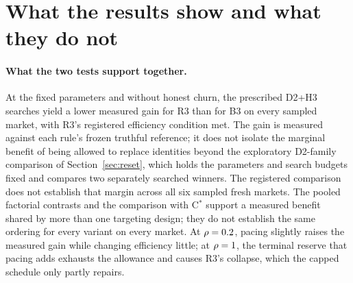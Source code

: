 \documentclass[11pt]{article}
\begin{document}
\begin{table}\centering\small
{}
\caption{Exploratory follow-up: per churn rate and rule, under the rule's selected attack, the share of the attacker's jobs audited, the share of jobs served by honest identities younger than ten rounds and the share of all audits they receive, the audited share of established honest jobs, the number of markets whose selected attack never replaces its identity, and gross efficiency; means over the six markets; frozen / doubled searches where two values are given. These statistics were defined after the results at $p$ =  and  and before the runs at  and .}\label{tab:ph-churn-audit}
\end{table}
\begin{table}[t]\centering\small
{}
\caption{Prospective-exploratory replication on six new markets (rep0 to rep5), planned and timestamped before they were drawn: the change of $d$ = C$^*$ minus R3, $q$ = B3 minus R3, and $u$ = C-thr() minus R3 from the same market's no-churn value, as the mean over the six markets with its market $t$ interval ( degrees of freedom) and the number of markets where the contrast is lower than without churn; and the absolute contrasts at each churn rate $p$. Primary winners (the continued winner where the doubling check was flagged) and all-frozen winners. The intervals omit search uncertainty; per-market values and seed-bootstrap intervals are in Appendix~\ref{sec:app-rep}.}\label{tab:replication}
\end{table}
\FloatBarrier

\section{What the results show and what they do not}\label{sec:discussion}
\paragraph{What the two tests support together.} At the fixed parameters and without honest churn, the prescribed D2+H3 searches yield a lower measured gain for R3 than for B3 on every sampled market, with R3's registered efficiency condition met. The gain is measured against each rule's frozen truthful reference; it does not isolate the marginal benefit of being allowed to replace identities beyond the exploratory D2-family comparison of Section~\ref{sec:reset}, which holds the parameters and search budgets fixed and compares two separately searched winners. The registered comparison does not establish that margin across all six sampled fresh markets. The pooled factorial contrasts and the comparison with C$^*$ support a measured benefit shared by more than one targeting design; they do not establish the same ordering for every variant on every market. At $\rho = 0.2$, pacing slightly raises the measured gain while changing efficiency little; at $\rho = 1$, the terminal reserve that pacing adds exhausts the allowance and causes R3's collapse, which the capped schedule only partly repairs.
\end{document}
